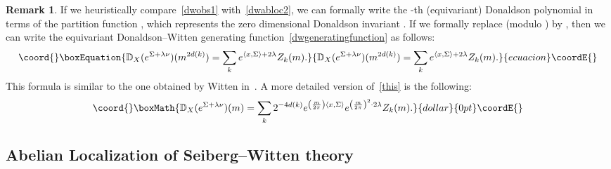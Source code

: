 \documentclass[a4paper,12pt,reqno,sumlimits]{amsart}
\theoremstyle{plain}
\theoremstyle{definition}
\newtheorem{rem}[thm]{Remark}
\providecommand{\D}{{\mathbb D}}
\providecommand{\1}{{\bf 1}}
\providecommand{\calO}{{\mathcal O}}
\providecommand{\ip}[1]{\langle #1 \rangle}
\numberwithin{equation}{section}
\begin{document}
\begin{rem}
  \label{dwrem}
  If we heuristically compare~\eqref{dwobs1} with~\eqref{dwabloc2}, we can
  formally write the \coordHE{}-th (equivariant) Donaldson polynomial
  \myHighlight{$\D_k(\calO)(m)$}\coordHE{} in terms of the partition function \coordHE{}, which
  represents the zero dimensional Donaldson invariant \coordHE{}. If we formally
  replace (modulo \myHighlight{$2\pi$}\coordHE{}) \coordHE{} by \coordHE{}, then we can write the
  equivariant Donaldson--Witten generating
  function~\eqref{dwgeneratingfunction} as follows:
  \begin{equation}\coord{}\boxEquation{
    \label{this}
    \D_X(e^{\Sigma+\lambda\nu})(m^{2d(k)})=\sum_k e^{\ip{x,\Sigma}+2\lambda} Z_k(m).
  }{
    \D_X(e^{\Sigma+\lambda\nu})(m^{2d(k)})=\sum_k e^{\ip{x,\Sigma}+2\lambda} Z_k(m).
  }{ecuacion}\coordE{}\end{equation}
  This formula is similar to the one obtained by Witten
  in~\cite[(2.36)]{ewdon2}. A more detailed version of~\eqref{this} is the
  following:
  $$\coord{}\boxMath{
  \D_X(e^{\Sigma+\lambda\nu})(m)=\sum_k 2^{-4d(k)}
  e^{\left(\frac{m}{2\pi}\right)\ip{x,\Sigma}}
  e^{\left(\frac{m}{2\pi}\right)^2\cdot 2\lambda} Z_k(m).
  }{dollar}{0pt}\coordE{}$$
\end{rem}




\subsection{Abelian Localization of Seiberg--Witten theory}
\label{chswabloc}
\end{document}
